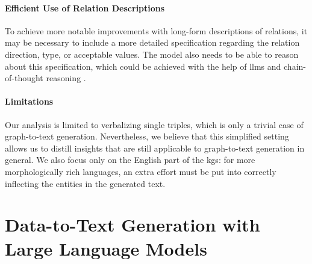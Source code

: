\paragraph{Efficient Use of Relation Descriptions} To achieve more notable improvements with long-form descriptions of relations, it may be necessary to include a more detailed specification regarding the relation direction, type, or acceptable values. The model also needs to be able to reason about this specification, which could be achieved with the help of \acp{llm} and chain-of-thought reasoning \cite{weiChainThoughtPrompting2022,zhaoInvestigatingTabletoTextGeneration2023}.


\paragraph{Limitations} Our analysis is limited to verbalizing single triples, which is only a trivial case of graph-to-text generation. Nevertheless, we believe that this simplified setting allows us to distill insights that are still applicable to graph-to-text generation in general. We also focus only on the English part of the \acp{kg}: for more morphologically rich languages, an extra effort must be put into correctly inflecting the entities in the generated text.






\section{Data-to-Text Generation with Large Language Models}
\label{sec:quintd}

